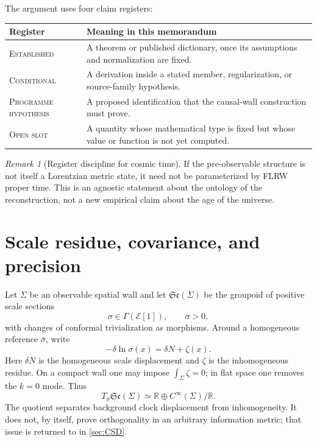 \documentclass[11pt]{article}
\numberwithin{equation}{section}
\newcommand{\Sc}{\mathfrak{Sc}}
\newcommand{\status}[1]{\textsc{\footnotesize #1}}
\theoremstyle{definition}
\theoremstyle{remark}
\newtheorem{remark}[theorem]{Remark}
\begin{document}
The argument uses four claim registers:
\begin{center}
\begin{tabularx}{0.94\textwidth}{@{}p{}Y@{}}
\toprule
\textbf{Register} & \textbf{Meaning in this memorandum}\\
\midrule
\status{Established} & A theorem or published dictionary, once its assumptions and normalization are fixed.\\
\status{Conditional} & A derivation inside a stated member, regularization, or source-family hypothesis.\\
\status{Programme hypothesis} & A proposed identification that the causal-wall construction must prove.\\
\status{Open slot} & A quantity whose mathematical type is fixed but whose value or function is not yet computed.\\
\bottomrule
\end{tabularx}
\end{center}

\begin{remark}[Register discipline for cosmic time]
If the pre-observable structure is not itself a Lorentzian metric state, it need not be parameterized by FLRW proper time. This is an agnostic statement about the ontology of the reconstruction, not a new empirical claim about the age of the universe.
\end{remark}

\section{Scale residue, covariance, and precision}

Let $\Sigma$ be an observable spatial wall and let $\Sc(\Sigma)$ be the groupoid of positive scale sections
\begin{equation}
\sigma\in\Gamma(\mathcal E[1]),\qquad \sigma>0,
\end{equation}
with changes of conformal trivialization as morphisms. Around a homogeneous reference $\bar\sigma$, write
\begin{equation}
-\delta\ln\sigma(x)=\delta N+\zeta(x).
\end{equation}
Here $\delta N$ is the homogeneous scale displacement and $\zeta$ is the inhomogeneous residue. On a compact wall one may impose $\int_\Sigma\zeta=0$; in flat space one removes the $k=0$ mode. Thus
\begin{equation}
T_{\bar\sigma}\Sc(\Sigma)
\simeq \mathbb R\oplus C^\infty(\Sigma)/\mathbb R.
\end{equation}
The quotient separates background clock displacement from inhomogeneity. It does not, by itself, prove orthogonality in an arbitrary information metric; that issue is returned to in \cref{sec:CSD}.
\end{document}
